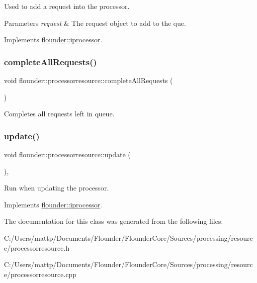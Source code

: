 Used to add a request into the processor. 


\begin{DoxyParams}{Parameters}
{\em request} & The request object to add to the que. \\
\hline
\end{DoxyParams}


Implements \hyperlink{classflounder_1_1iprocessor_ad721814a6a2c69f526527c7b2f57a11b}{flounder\+::iprocessor}.

\mbox{\label{classflounder_1_1processorresource_afde339d8e44544307abd585e8294fa85}} 
\subsubsection{\texorpdfstring{complete\+All\+Requests()}{completeAllRequests()}}
{\footnotesize\ttfamily void flounder\+::processorresource\+::complete\+All\+Requests (\begin{DoxyParamCaption}{ }\end{DoxyParamCaption})}



Completes all requests left in queue. 

\mbox{\label{classflounder_1_1processorresource_afaeb27a9673c1f9b4366b537b7c0d377}} 
\subsubsection{\texorpdfstring{update()}{update()}}
{\footnotesize\ttfamily void flounder\+::processorresource\+::update (\begin{DoxyParamCaption}{ }\end{DoxyParamCaption})\hspace{0.3cm}{\ttfamily [override]}, {\ttfamily [virtual]}}



Run when updating the processor. 



Implements \hyperlink{classflounder_1_1iprocessor_ad2edfece3465ec3dbe0a5feac26bdbc3}{flounder\+::iprocessor}.



The documentation for this class was generated from the following files\+:\begin{DoxyCompactItemize}
\item 
C\+:/\+Users/mattp/\+Documents/\+Flounder/\+Flounder\+Core/\+Sources/processing/resource/processorresource.\+h\item 
C\+:/\+Users/mattp/\+Documents/\+Flounder/\+Flounder\+Core/\+Sources/processing/resource/processorresource.\+cpp\end{DoxyCompactItemize}
